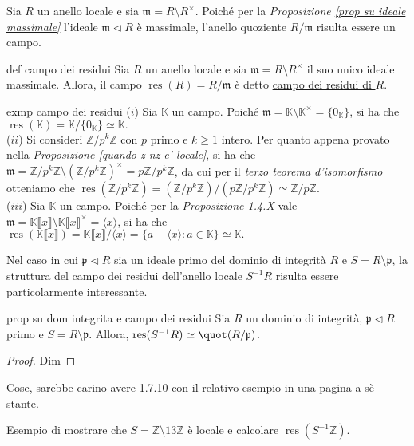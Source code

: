 \noindent Sia $R$ un anello locale e sia $\mathfrak{m}=R\setminus R^{\times}$. Poiché per la \emph{Proposizione \ref{prop su ideale massimale}} 
l'ideale $\mathfrak{m}\lhd R$ è massimale, l'anello quoziente $R/\mathfrak{m}$ risulta essere un campo.

\begin{defn}{def campo dei residui}
Sia $R$ un anello locale e sia $\mathfrak{m}=R\setminus R^{\times}$ il suo unico ideale massimale. Allora, il campo $\operatorname{res}(R)=R/\mathfrak{m}$ è detto \underline{campo dei residui di $R$}.
\end{defn}

\begin{example}[]{exmp campo dei residui}
  ($i$) Sia $\mathbb{K}$ un campo. Poiché $\mathfrak{m}=\mathbb{K}\setminus \mathbb{K}^{\times}=\{0_{\mathbb{K}}\}$, si ha che 
  $\operatorname{res}(\mathbb{K})=\mathbb{K}/\{0_{\mathbb{K}}\}\simeq \mathbb{K}.$\\

  \noindent ($ii$) Si consideri $\mathbb{Z}/p^k\mathbb{Z}$ con $p$ primo e $k\geq 1$ intero. Per quanto appena provato nella 
  \emph{Proposizione \ref{quando z nz e' locale}}, si ha che $\mathfrak{m}=\mathbb{Z}/p^k\mathbb{Z}\setminus 
  (\mathbb{Z}/p^k\mathbb{Z})^{\times}=p\mathbb{Z}/p^k\mathbb{Z}$, da cui per il \emph{terzo teorema d'isomorfismo} otteniamo che 
  $\operatorname{res}(\mathbb{Z}/p^k\mathbb{Z})=(\mathbb{Z}/p^k\mathbb{Z})/(p\mathbb{Z}/p^k\mathbb{Z})\simeq \mathbb{Z}/p\mathbb{Z}.$ \\

  \noindent ($iii$) Sia $\mathbb{K}$ un campo. Poiché per la \emph{Proposizione 1.4.X} vale 
  $\mathfrak{m}=\mathbb{K}\llbracket x\rrbracket\setminus\mathbb{K}\llbracket x\rrbracket^{\times}=\langle x \rangle$, si ha che 
  $\operatorname{res}(\mathbb{K}\llbracket x\rrbracket)=\mathbb{K}\llbracket x\rrbracket/\langle x\rangle = 
  \{a+\langle x\rangle : a\in \mathbb{K}\}\simeq \mathbb{K}.$
\end{example}

\noindent Nel caso in cui $\mathfrak{p}\lhd R$ sia un ideale primo del dominio di integrità $R$ e $S=R\setminus \mathfrak{p}$, 
la struttura del campo dei residui dell'anello locale $S^{-1}R$ risulta essere particolarmente interessante.

\begin{prop}[1.7.10]{prop su dom integrita e campo dei residui}
Sia $R$ un dominio di integrità, $\mathfrak{p}\lhd R$ primo e $S=R\setminus \mathfrak{p}$. Allora, $\operatorname{res}(S^{-1}R)\simeq \quot(R/\mathfrak{p})$.
\end{prop}
\vspace{-4mm}
\begin{proof}
Dim
\end{proof}

\noindent Cose, sarebbe carino avere 1.7.10 con il relativo esempio in una pagina a sè stante.

\begin{exm}Esempio di mostrare che $S=\mathbb{Z}\setminus 13\mathbb{Z}$ è locale e calcolare $\operatorname{res}(S^{-1}\mathbb{Z})$.\end{exm}
